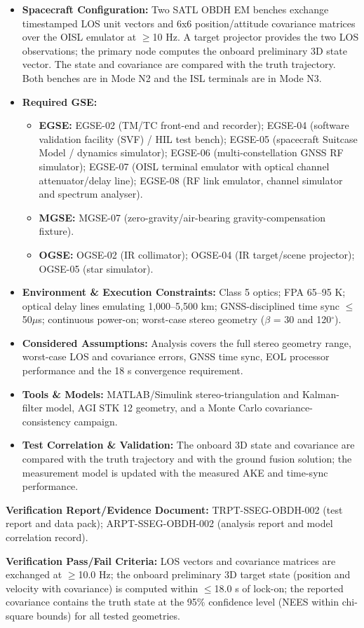 \begin{itemize}
\item \textbf{Spacecraft Configuration:} Two SATL OBDH EM benches exchange timestamped LOS unit vectors and 6x6 position/attitude covariance matrices over the OISL emulator at $\ge$10 Hz. A target projector provides the two LOS observations; the primary node computes the onboard preliminary 3D state vector. The state and covariance are compared with the truth trajectory. Both benches are in Mode N2 and the ISL terminals are in Mode N3.
\item \textbf{Required GSE:}
\begin{itemize}
\item \textbf{EGSE:} EGSE-02 (TM/TC front-end and recorder); EGSE-04 (software validation facility (SVF) / HIL test bench); EGSE-05 (spacecraft Suitcase Model / dynamics simulator); EGSE-06 (multi-constellation GNSS RF simulator); EGSE-07 (OISL terminal emulator with optical channel attenuator/delay line); EGSE-08 (RF link emulator, channel simulator and spectrum analyser).
\item \textbf{MGSE:} MGSE-07 (zero-gravity/air-bearing gravity-compensation fixture).
\item \textbf{OGSE:} OGSE-02 (IR collimator); OGSE-04 (IR target/scene projector); OGSE-05 (star simulator).
\end{itemize}
\item \textbf{Environment \& Execution Constraints:} Class 5 optics; FPA 65--95 K; optical delay lines emulating 1,000--5,500 km; GNSS-disciplined time sync $\le$50$\mu$s; continuous power-on; worst-case stereo geometry ($\beta$ = 30 and 120$^\circ$).
\item \textbf{Considered Assumptions:} Analysis covers the full stereo geometry range, worst-case LOS and covariance errors, GNSS time sync, EOL processor performance and the 18 s convergence requirement.
\item \textbf{Tools \& Models:} MATLAB/Simulink stereo-triangulation and Kalman-filter model, AGI STK 12 geometry, and a Monte Carlo covariance-consistency campaign.
\item \textbf{Test Correlation \& Validation:} The onboard 3D state and covariance are compared with the truth trajectory and with the ground fusion solution; the measurement model is updated with the measured AKE and time-sync performance.
\end{itemize}
\par\textbf{Verification Report/Evidence Document:} TRPT-SSEG-OBDH-002 (test report and data pack); ARPT-SSEG-OBDH-002 (analysis report and model correlation record).
\par\textbf{Verification Pass/Fail Criteria:} LOS vectors and covariance matrices are exchanged at $\ge$10.0 Hz; the onboard preliminary 3D target state (position and velocity with covariance) is computed within $\le$18.0 s of lock-on; the reported covariance contains the truth state at the 95\% confidence level (NEES within chi-square bounds) for all tested geometries.
\par\medskip
